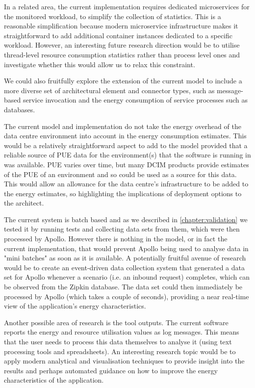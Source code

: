 In a related area, the current implementation requires dedicated microservices for the monitored workload, to simplify the collection of statistics.  This is a reasonable simplification because modern microservice infrastructure makes it straightforward to add additional container instances dedicated to a specific workload.  However, an interesting future research direction would be to utilise thread-level resource consumption statistics rather than process level ones and investigate whether this would allow us to relax this constraint.

We could also fruitfully explore the extension of the current model to include a more diverse set of architectural element and connector types, such as message-based service invocation and the energy consumption of service processes such as databases.

The current model and implementation do not take the energy overhead of the data centre environment into account in the energy consumption estimates.  This would be a relatively straightforward aspect to add to the model provided that a reliable source of PUE data for the environment(s) that the software is running in was available.  PUE varies over time, but many DCIM products provide estimates of the PUE of an environment and so could be used as a source for this data.  This would allow an allowance for the data centre's infrastructure to be added to the energy estimates, so highlighting the implications of deployment options to the architect.

The current system is batch based and as we described in \cref{chapter:validation} we tested it by running tests and collecting data sets from them, which were then processed by Apollo.  However there is nothing in the model, or in fact the current implementation, that would prevent Apollo being used to analyse data in "mini batches" as soon as it is available.  A potentially fruitful avenue of research would be to create an event-driven data collection system that generated a data set for Apollo whenever a scenario (i.e. an inbound request) completes, which can be observed from the Zipkin database.  The data set could then immediately be processed by Apollo (which takes a couple of seconds), providing a near real-time view of the application's energy characteristics.

Another possible area of research is the tool outputs.  The current software reports the energy and resource utilisation values as log messages.  This means that the user needs to process this data themselves to analyse it (using text processing tools and spreadsheets).  An interesting research topic would be to apply modern analytical and visualisation techniques to provide insight into the results and perhaps automated guidance on how to improve the energy characteristics of the application.

